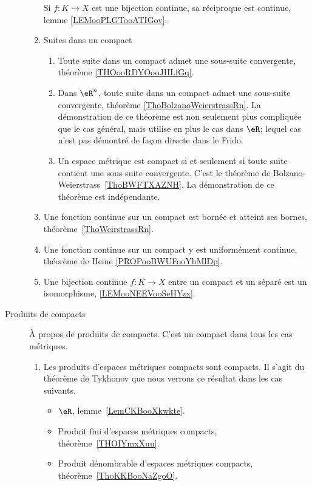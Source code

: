 \begin{description}
\begin{enumerate}
                    Si \( f\colon K\to X\) est une bijection continue, sa réciproque est continue, lemme \ref{LEMooPLGTooATIGov}.
		      \item
		            Suites dans un compact
		            \begin{enumerate}
			            \item
			                  Toute suite dans un compact admet une sous-suite convergente, théorème \ref{THOooRDYOooJHLfGq}.
			            \item
			                  Dans \( \eR^n\), toute suite dans un compact admet une sous-suite convergente, théorème \ref{ThoBolzanoWeierstrassRn}. La démonstration de ce théorème est non seulement plus compliquée que le cas général, mais utilise en plus le cas dans \( \eR\); lequel cas n'est pas démontré de façon directe dans le Frido.
			            \item
			                  Un espace métrique est compact si et seulement si toute suite contient une sous-suite convergente. C'est le théorème de Bolzano-Weierstrass~\ref{ThoBWFTXAZNH}. La démonstration de ce théorème est indépendante.
		            \end{enumerate}
		      \item
		            Une fonction continue sur un compact est bornée et atteint ses bornes, théorème~\ref{ThoWeirstrassRn}.
		      \item
		            Une fonction continue sur un compact y est uniformément continue, théorème de Heine \ref{PROPooBWUFooYhMlDp}.
                \item
                    Une bijection continue \( f\colon K\to X\) entre un compact et un séparé est un isomorphisme, \ref{LEMooNEEVooSeHYzx}.
	      \end{enumerate}

	\item[Produits de compacts]
	      À propos de produits de compacts. C'est un compact dans tous les cas métriques.
	      \begin{enumerate}
		      \item
		            Les produits d'espaces métriques compacts sont compacts. Il s'agit du théorème de Tykhonov que nous verrons ce résultat dans les cas suivants.
		            \begin{itemize}
			            \item
			                  \( \eR\), lemme~\ref{LemCKBooXkwkte}.
			            \item
			                  Produit fini d'espaces métriques compacts, théorème~\ref{THOIYmxXuu}.
			            \item
			                  Produit dénombrable d'espaces métriques compacts, théorème~\ref{ThoKKBooNaZgoO}.
		            \end{itemize}
	      \end{enumerate}
\end{description}


